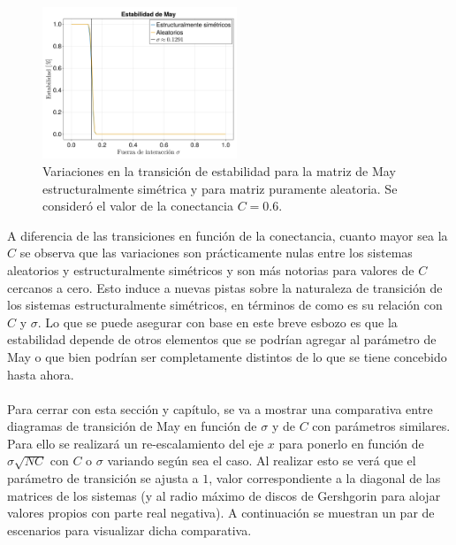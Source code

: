 \newpage
\begin{figure} \vspace{-30pt} \begin{center}
		\includegraphics[width=0.52\textwidth]{../Imagenes/TransicionσDirvsNoDir} 
	\end{center} 
	\vspace{-20pt} 
	\caption{Variaciones en la transición de estabilidad para la matriz de May estructuralmente simétrica y para matriz puramente aleatoria. Se consideró el valor de la conectancia $C=0.6$.} 
	\vspace{-10pt}
	\label{fig:TransicionσDirvsNoDir}
\end{figure} 
A diferencia de las transiciones en función de la conectancia, cuanto mayor sea la $C$ se observa que las variaciones son prácticamente nulas entre los sistemas aleatorios y estructuralmente simétricos y son más notorias para valores de $C$ cercanos a cero. Esto induce a nuevas pistas sobre la naturaleza de transición de los sistemas estructuralmente simétricos, en términos de como es su relación con $C$ y $\sigma$. Lo que se puede asegurar con base en este breve esbozo es que la estabilidad depende de otros elementos que se podrían agregar al parámetro de May o que bien podrían ser completamente distintos de lo que se tiene concebido hasta ahora.\\
\\
Para cerrar con esta sección y capítulo, se va a mostrar una comparativa entre diagramas de transición de May en función de $\sigma$ y de $C$ con parámetros similares. Para ello se realizará un re-escalamiento del eje $x$ para ponerlo en función de $\sigma\sqrt{NC}$ con $C$ o $\sigma$ variando según sea el caso. Al realizar esto se verá que el parámetro de transición se ajusta a $1$, valor correspondiente a la diagonal de las matrices de los sistemas (y al radio máximo de discos de Gershgorin para alojar valores propios con parte real negativa). A continuación se muestran un par de escenarios para visualizar dicha comparativa.
